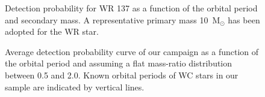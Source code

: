 \begin{figure}
    \centering
    \caption{Detection probability for WR 137 as a function of the orbital period and secondary mass. A representative primary mass 10~M$_{\odot}$ has been adopted for the WR star.}
    \label{f:Pdetect137}
\end{figure}
\begin{figure}
    \centering
    \caption{Average detection probability curve of our campaign as a function of the orbital period and assuming a flat mass-ratio distribution between 0.5 and 2.0. Known orbital periods of WC stars in our sample are indicated by vertical lines.}
    \label{f:Pdetect}
\end{figure}
